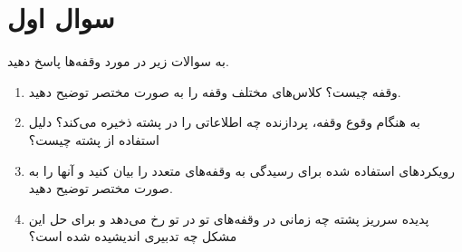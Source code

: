 \section{سوال اول}

به سوالات زیر در مورد وقفه‌ها پاسخ دهید.

\begin{enumerate}
	\item 
	وقفه چیست؟ کلاس‌های مختلف وقفه را به صورت مختصر توضیح دهید.
	\begin{qsolve}
		
	\end{qsolve}
	
	
	\item 
	به هنگام وقوع وقفه، پردازنده چه اطلاعاتی را در پشته ذخیره می‌کند؟ دلیل استفاده از پشته چیست؟ 
	\begin{qsolve}
		
	\end{qsolve}
	
	
	\item 
	رویکردهای استفاده شده برای رسیدگی به وقفه‌های متعدد را بیان کنید و آنها را به صورت مختصر توضیح دهید.
	\begin{qsolve}
		
	\end{qsolve}
	
	
	\item 
	پدیده سرریز پشته چه زمانی در وقفه‌های تو در تو رخ می‌دهد و برای حل این مشکل چه تدبیری اندیشیده شده است؟
	\begin{qsolve}
		
	\end{qsolve}
	
\end{enumerate}

